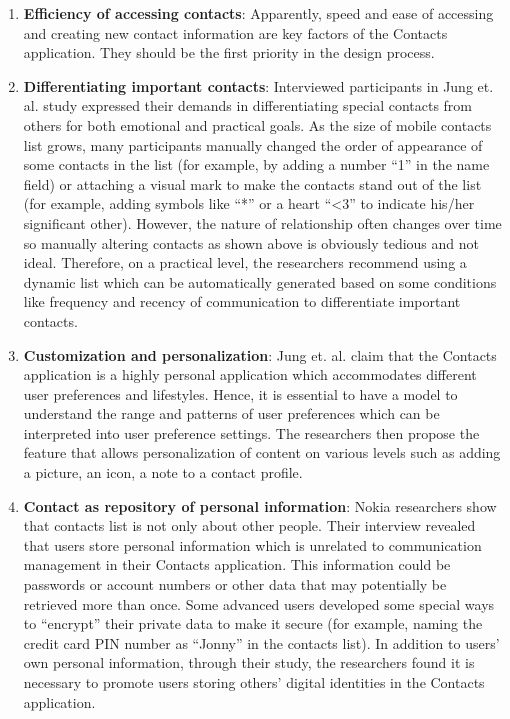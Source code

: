 \begin{enumerate}
  \item \textbf{Efficiency of accessing contacts}: Apparently, speed and ease of accessing and creating new contact information are key factors of the Contacts application. They should be the first priority in the design process.
  \item \textbf{Differentiating important contacts}: Interviewed participants in Jung et. al. study expressed their demands in differentiating special contacts from others for both emotional and practical goals. As the size of mobile contacts list grows, many participants manually changed the order of appearance of some contacts in the list (for example, by adding a number ``1'' in the name field) or attaching a visual mark to make the contacts stand out of the list (for example, adding symbols like ``*'' or a heart ``<3'' to indicate his/her significant other). However, the nature of relationship often changes over time so manually altering contacts as shown above is obviously tedious and not ideal. Therefore, on a practical level, the researchers recommend using a dynamic list which can be automatically generated based on some conditions like frequency and recency of communication to differentiate important contacts.
  \item \textbf{Customization and personalization}: Jung et. al. claim that the Contacts application is a highly personal application which accommodates different user preferences and lifestyles. Hence, it is essential to have a model to understand the range and patterns of user preferences which can be interpreted into user preference settings. The researchers then propose the feature that allows personalization of content on various levels such as adding a picture, an icon, a note to a contact profile.
  \item \textbf{Contact as repository of personal information}: Nokia researchers show that contacts list is not only about other people. Their interview revealed that users store personal information which is unrelated to communication management in their Contacts application. This information could be passwords or account numbers or other data that may potentially be retrieved more than once. Some advanced users developed some special ways to ``encrypt'' their private data to make it secure (for example, naming the credit card PIN number as ``Jonny'' in the contacts list). In addition to users' own personal information, through their study, the researchers found it is necessary to promote users storing others' digital identities in the Contacts application. 

\end{enumerate}
